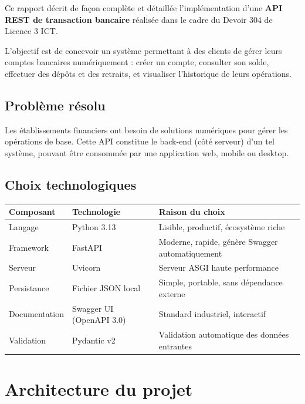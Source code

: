 \documentclass[12pt,a4paper]{article}
\begin{document}
Ce rapport décrit de façon complète et détaillée l'implémentation d'une \textbf{API REST de transaction bancaire} réalisée dans le cadre du Devoir 304 de Licence 3 ICT.

L'objectif est de concevoir un système permettant à des clients de gérer leurs comptes bancaires numériquement : créer un compte, consulter son solde, effectuer des dépôts et des retraits, et visualiser l'historique de leurs opérations.

\subsection{Problème résolu}

Les établissements financiers ont besoin de solutions numériques pour gérer les opérations de base. Cette API constitue le back-end (côté serveur) d'un tel système, pouvant être consommée par une application web, mobile ou desktop.

\subsection{Choix technologiques}

\begin{center}
\begin{tabular}{lll}
\toprule
\textbf{Composant} & \textbf{Technologie} & \textbf{Raison du choix} \\
\midrule
Langage & Python 3.13 & Lisible, productif, écosystème riche \\
Framework & FastAPI & Moderne, rapide, génère Swagger automatiquement \\
Serveur & Uvicorn & Serveur ASGI haute performance \\
Persistance & Fichier JSON local & Simple, portable, sans dépendance externe \\
Documentation & Swagger UI (OpenAPI 3.0) & Standard industriel, interactif \\
Validation & Pydantic v2 & Validation automatique des données entrantes \\
\bottomrule
\end{tabular}
\end{center}

\section{Architecture du projet}
\end{document}
